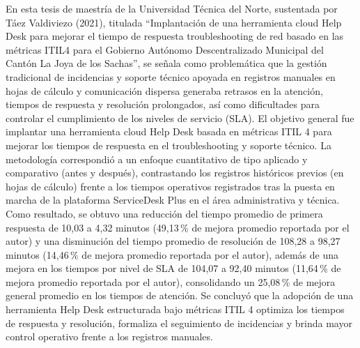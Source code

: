 En esta tesis de maestría de la Universidad Técnica del Norte, sustentada por Táez Valdiviezo (2021), titulada ``Implantación de una herramienta cloud Help Desk para mejorar el tiempo de respuesta troubleshooting de red basado en las métricas ITIL4 para el Gobierno Autónomo Descentralizado Municipal del Cantón La Joya de los Sachas'', se señala como problemática que la gestión tradicional de incidencias y soporte técnico apoyada en registros manuales en hojas de cálculo y comunicación dispersa generaba retrasos en la atención, tiempos de respuesta y resolución prolongados, así como dificultades para controlar el cumplimiento de los niveles de servicio (SLA). El objetivo general fue implantar una herramienta cloud Help Desk basada en métricas ITIL 4 para mejorar los tiempos de respuesta en el troubleshooting y soporte técnico. La metodología correspondió a un enfoque cuantitativo de tipo aplicado y comparativo (antes y después), contrastando los registros históricos previos (en hojas de cálculo) frente a los tiempos operativos registrados tras la puesta en marcha de la plataforma ServiceDesk Plus en el área administrativa y técnica. Como resultado, se obtuvo una reducción del tiempo promedio de primera respuesta de 10,03 a 4,32 minutos (49,13\,\% de mejora promedio reportada por el autor) y una disminución del tiempo promedio de resolución de 108,28 a 98,27 minutos (14,46\,\% de mejora promedio reportada por el autor), además de una mejora en los tiempos por nivel de SLA de 104,07 a 92,40 minutos (11,64\,\% de mejora promedio reportada por el autor), consolidando un 25,08\,\% de mejora general promedio en los tiempos de atención. Se concluyó que la adopción de una herramienta Help Desk estructurada bajo métricas ITIL 4 optimiza los tiempos de respuesta y resolución, formaliza el seguimiento de incidencias y brinda mayor control operativo frente a los registros manuales.

\vspace{0.8em}

